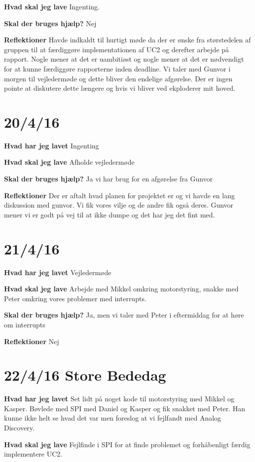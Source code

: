 \documentclass{article}
\begin{document}
	\textbf{Hvad skal jeg lave}
	Ingenting.
	
	\textbf{Skal der bruges hjælp?}
	Nej
	
	\textbf{Reflektioner}
	Havde indkaldt til hurtigt møde da der er ønske fra størstedelen af gruppen til at færdiggøre implementationen af UC2 og derefter arbejde på rapport. Nogle mener at det er uambitiøst og nogle mener at det er nødvendigt for at kunne færdiggøre rapporterne inden deadline. Vi taler med Gunvor i morgen til vejledermøde og dette bliver den endelige afgørelse. Der er ingen pointe at diskutere dette længere og hvis vi bliver ved ekploderer mit hoved.
	
	\section{20/4/16}
	\textbf{Hvad har jeg lavet}
	Ingenting
	
	\textbf{Hvad skal jeg lave}
	Afholde vejledermøde
	
	\textbf{Skal der bruges hjælp?}
	Ja vi har brug for en afgørelse fra Gunvor
	
	\textbf{Reflektioner}
	Der er aftalt hvad planen for projektet er og vi havde en lang diskussion med gunvor. Vi fik vores vilje og de andre fik også deres. Gunvor mener vi er godt på vej til at ikke dumpe og det har jeg det fint med. 
	
	\section{21/4/16}
	\textbf{Hvad har jeg lavet}
	Vejledermøde
	
	\textbf{Hvad skal jeg lave}
	Arbejde med Mikkel omkring motorstyring, snakke med Peter omkring vores problemer med interrupts.
	
	\textbf{Skal der bruges hjælp?}
	Ja, men vi taler med Peter i eftermiddag for at høre om interrupts 
	
	\textbf{Reflektioner}
	Nej
	
	\section{22/4/16 Store Bededag}
	\textbf{Hvad har jeg lavet}
	Set lidt på noget kode til motorstyring med Mikkel og Kasper. Bøvlede med SPI med Daniel og Kasper og fik snakket med Peter. Han kunne ikke helt se hvad det var men foreslog at vi fejlfandt med Analog Discovery.
	
	\textbf{Hvad skal jeg lave}
	Fejlfinde i SPI for at finde problemet og forhåbenligt færdig implementere UC2. 
	
\end{document}

